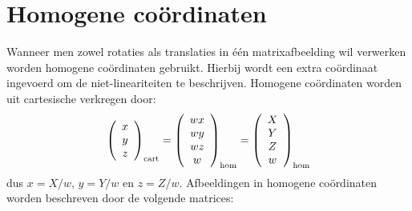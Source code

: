 \section{Homogene co\"ordinaten}
Wanneer men zowel rotaties als translaties in \'e\'en matrixafbeelding wil
verwerken worden homogene co\"ordinaten gebruikt. Hierbij wordt een extra
co\"ordinaat ingevoerd om de niet-lineariteiten te beschrijven. Homogene
co\"ordinaten worden uit cartesische verkregen door:
\[
\left(\begin{array}{c}x\\ y\\ z\end{array}\right)_{\rm cart}=
\left(\begin{array}{c}wx\\ wy\\ wz\\ w\end{array}\right)_{\rm hom}=
\left(\begin{array}{c}X\\ Y\\ Z\\ w\end{array}\right)_{\rm hom}
\]
dus $x=X/w$, $y=Y/w$ en $z=Z/w$. Afbeeldingen in homogene co\"ordinaten
worden beschreven door de volgende matrices:
